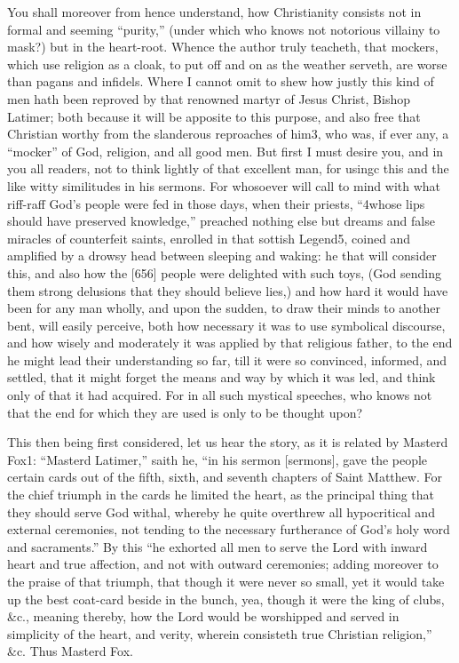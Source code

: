 You shall moreover from hence understand, how Christianity consists not in formal and seeming “purity,” (under which who knows not notorious villainy to mask?) but in the heart-root. Whence the author truly teacheth, that mockers, which use religion as a cloak, to put off and on as the weather serveth, are worse than pagans and infidels. Where I cannot omit to shew how justly this kind of men hath been reproved by that renowned martyr of Jesus Christ, Bishop Latimer; both because it will be apposite to this purpose, and also free that Christian worthy from the slanderous reproaches of him3, who was, if ever any, a “mocker” of God, religion, and all good men. But first I must desire you, and in you all readers, not to think lightly of that excellent man, for usingc this and the like witty similitudes in his sermons. For whosoever will call to mind with what riff-raff God’s people were fed in those days, when their priests, “4whose lips should have preserved knowledge,” preached nothing else but dreams and false miracles of counterfeit saints, enrolled in that sottish Legend5, coined and amplified by a drowsy head between sleeping and waking: he that will consider this, and also how the [656] people were delighted with such toys, (God sending them strong delusions that they should believe lies,) and how hard it would have been for any man wholly, and upon the sudden, to draw their minds to another bent, will easily perceive, both how necessary it was to use symbolical discourse, and how wisely and moderately it was applied by that religious father, to the end he might lead their understanding so far, till it were so convinced, informed, and settled, that it might forget the means and way by which it was led, and think only of that it had acquired. For in all such mystical speeches, who knows not that the end for which they are used is only to be thought upon?

This then being first considered, let us hear the story, as it is related by Masterd Fox1: “Masterd Latimer,” saith he, “in his sermon [sermons], gave the people certain cards out of the fifth, sixth, and seventh chapters of Saint Matthew. For the chief triumph in the cards he limited the heart, as the principal thing that they should serve God withal, whereby he quite overthrew all hypocritical and external ceremonies, not tending to the necessary furtherance of God’s holy word and sacraments.” By this “he exhorted all men to serve the Lord with inward heart and true affection, and not with outward ceremonies; adding moreover to the praise of that triumph, that though it were never so small, yet it would take up the best coat-card beside in the bunch, yea, though it were the king of clubs, &c., meaning thereby, how the Lord would be worshipped and served in simplicity of the heart, and verity, wherein consisteth true Christian religion,” &c. Thus Masterd Fox.

